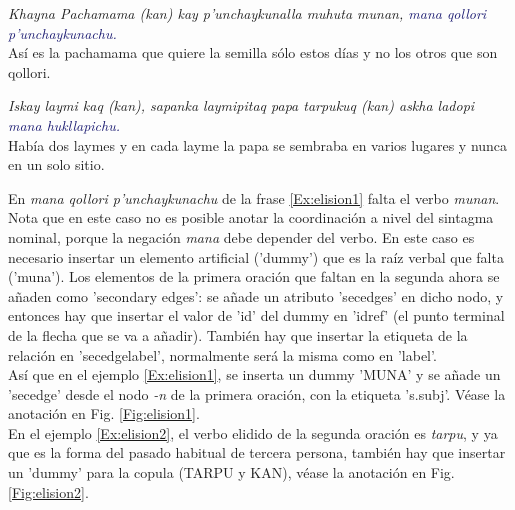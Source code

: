 \documentclass[a4paper,11pt,DIV12]{scrartcl}
\begin{document}
\begin{examples}
 \item\label{Ex:elision1} {\em Khayna Pachamama (kan) kay p'unchaykunalla muhuta munan, \textcolor{MidnightBlue}{mana qollori p'unchaykunachu.}}\\
	Así es la pachamama que quiere la semilla sólo estos días y no los otros que son qollori.\\
	 	\hfill{\small \citep{Valderrama77}}
\item\label{Ex:elision2} {\em Iskay laymi kaq (kan), sapanka laymipitaq papa tarpukuq (kan) askha ladopi \textcolor{MidnightBlue}{mana hukllapichu.}}\\
      Había dos laymes y en cada layme la papa se sembraba en varios lugares y nunca en un solo sitio.\\
	 	\hfill{\small \citep{Valderrama77}}
\end{examples}

En {\em mana qollori p'unchaykunachu} de la frase \ref{Ex:elision1} falta el verbo {\em munan}. Nota que en este caso no es posible anotar la coordinaci\'on a nivel del sintagma nominal, porque la negaci\'on {\em mana} debe depender del verbo. En este caso es necesario insertar un elemento artificial ('dummy') que es la ra\'iz verbal que falta ('muna'). Los elementos de la primera oraci\'on que faltan en la segunda ahora se a\~naden como 'secondary edges': se a\~nade un atributo  'secedges' en dicho nodo, y entonces hay que insertar el valor de 'id' del dummy en 'idref' (el punto terminal de la flecha que se va a a\~nadir). Tambi\'en hay que insertar la etiqueta de la relaci\'on en 'secedgelabel', normalmente ser\'a la misma como en 'label'.\\
As\'i que en el ejemplo \ref{Ex:elision1}, se inserta un dummy 'MUNA' y se a\~nade un 'secedge' desde el nodo {\em -n} de la primera oraci\'on, con la etiqueta 's.subj'. V\'ease la anotaci\'on en Fig. \ref{Fig:elision1}.\\
En el ejemplo \ref{Ex:elision2}, el verbo elidido de la segunda oraci\'on es {\em tarpu}, y ya que es la forma del pasado habitual de tercera persona, tambi\'en hay que insertar un 'dummy' para la copula (TARPU y KAN), v\'ease la anotaci\'on en Fig. \ref{Fig:elision2}.
\end{document}
